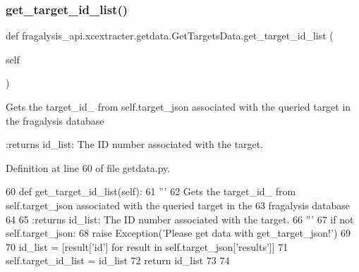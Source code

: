\subsubsection{\texorpdfstring{get\+\_\+target\+\_\+id\+\_\+list()}{get\_target\_id\_list()}}
{\footnotesize\ttfamily def fragalysis\+\_\+api.\+xcextracter.\+getdata.\+Get\+Targets\+Data.\+get\+\_\+target\+\_\+id\+\_\+list (\begin{DoxyParamCaption}\item[{}]{self }\end{DoxyParamCaption})}

\begin{DoxyVerb}Gets the target_id_ from self.target_json associated with the queried target in the 
fragalysis database

:returns id_list: The ID number associated with the target.
\end{DoxyVerb}
 

Definition at line 60 of file getdata.\+py.


\begin{DoxyCode}
60     \textcolor{keyword}{def }get\_target\_id\_list(self):
61         \textcolor{stringliteral}{'''}
62 \textcolor{stringliteral}{        Gets the target\_id\_ from self.target\_json associated with the queried target in the }
63 \textcolor{stringliteral}{        fragalysis database}
64 \textcolor{stringliteral}{}
65 \textcolor{stringliteral}{        :returns id\_list: The ID number associated with the target.}
66 \textcolor{stringliteral}{        '''}
67         \textcolor{keywordflow}{if} \textcolor{keywordflow}{not} self.target\_json:
68             \textcolor{keywordflow}{raise} Exception(\textcolor{stringliteral}{'Please get data with get\_target\_json!'})
69 
70         id\_list = [result[\textcolor{stringliteral}{'id'}] \textcolor{keywordflow}{for} result \textcolor{keywordflow}{in} self.target\_json[\textcolor{stringliteral}{'results'}]]
71         self.target\_id\_list = id\_list
72         \textcolor{keywordflow}{return} id\_list
73 
74 
\end{DoxyCode}
\mbox{\label{classfragalysis__api_1_1xcextracter_1_1getdata_1_1_get_targets_data_ab67e7a9bfced7f671422ef8f4b6997c9}} 

